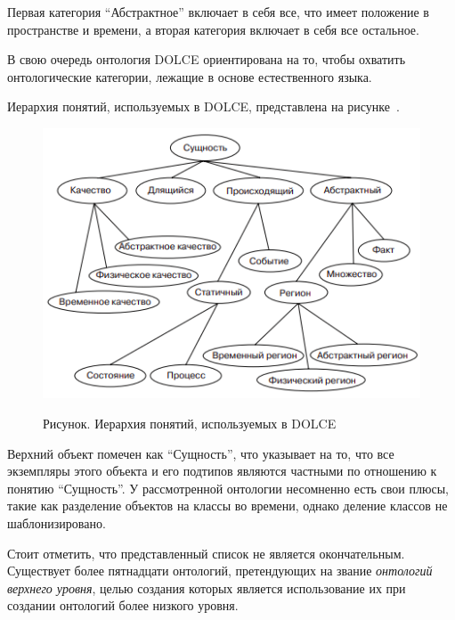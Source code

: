 Первая категория ``Абстрактное'' включает в себя все, что имеет положение в пространстве и времени, а вторая категория включает в себя все остальное.

В свою очередь онтология DOLCE ориентирована на то, чтобы охватить онтологические категории, лежащие в основе естественного языка.

Иерархия понятий, используемых в DOLCE, представлена на рисунке~\textit{}.

\begin{figure}[H]
	\caption{Рисунок. Иерархия понятий, используемых в DOLCE}
	\includegraphics[scale=0.8]{author/part2/figures/chapter_kb/dolce.png}
	\label{fig:dolce}
\end{figure}

Верхний объект помечен как ``Сущность'', что указывает на то, что все экземпляры этого объекта и его подтипов являются частными по отношению к понятию ``Сущность''. У рассмотренной онтологии несомненно есть свои плюсы, такие как разделение объектов на классы во времени, однако деление классов не шаблонизировано. 

Стоит отметить, что представленный список не является окончательным. Существует более пятнадцати онтологий, претендующих на звание \textit{онтологий верхнего уровня}, целью создания которых является использование их при создании онтологий более низкого уровня.

